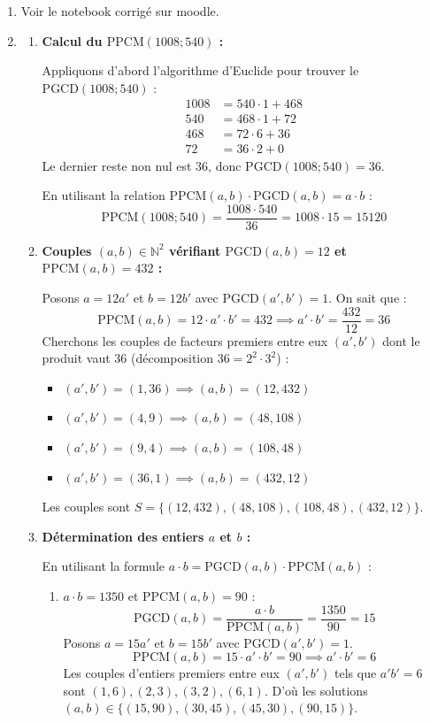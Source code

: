 \begin{enumerate}[label=\thechapter.\arabic*, font=\bfseries, itemsep=7mm,labelsep*=3mm,left=0mm]
\item Voir le notebook corrigé sur moodle.

\item
\begin{enumerate}[label=\textbf{\alph*)}, leftmargin=*]
	\item \textbf{Calcul du $\text{PPCM}(1008; 540)$ :}
	
	Appliquons d'abord l'algorithme d'Euclide pour trouver le $\text{PGCD}(1008; 540)$ :
	\begin{align*}
		1008 &= 540 \cdot 1 + 468 \\
		540 &= 468 \cdot 1 + 72 \\
		468 &= 72 \cdot 6 + 36 \\
		72 &= 36 \cdot 2 + 0
	\end{align*}
	Le dernier reste non nul est $36$, donc $\text{PGCD}(1008; 540) = 36$.
	
	En utilisant la relation $\text{PPCM}(a,b) \cdot \text{PGCD}(a,b) = a \cdot b$ :
	\[
	\text{PPCM}(1008; 540) = \frac{1008 \cdot 540}{36} = 1008 \cdot 15 = 15120
	\]
	
	\item \textbf{Couples $(a,b) \in \mathbb{N}^2$ vérifiant $\text{PGCD}(a,b) = 12$ et $\text{PPCM}(a,b) = 432$ :}
	
	Posons $a = 12a'$ et $b = 12b'$ avec $\text{PGCD}(a', b') = 1$.
	On sait que :
	\[
	\text{PPCM}(a,b) = 12 \cdot a' \cdot b' = 432 \implies a' \cdot b' = \frac{432}{12} = 36
	\]
	Cherchons les couples de facteurs premiers entre eux $(a', b')$ dont le produit vaut $36$ (décomposition $36 = 2^2 \cdot 3^2$) :
	\begin{itemize}
		\item $(a', b') = (1, 36) \implies (a,b) = (12, 432)$
		\item $(a', b') = (4, 9) \implies (a,b) = (48, 108)$
		\item $(a', b') = (9, 4) \implies (a,b) = (108, 48)$
		\item $(a', b') = (36, 1) \implies (a,b) = (432, 12)$
	\end{itemize}
	Les couples sont $S = \{(12, 432), (48, 108), (108, 48), (432, 12)\}$.
	
	\item \textbf{Détermination des entiers $a$ et $b$ :}
	
	En utilisant la formule $a \cdot b = \text{PGCD}(a,b) \cdot \text{PPCM}(a,b)$ :
	
	\begin{enumerate}[label=\textbf{\arabic*)}, leftmargin=*]
		\item $a \cdot b = 1350$ et $\text{PPCM}(a,b) = 90$ :
		\[
		\text{PGCD}(a,b) = \frac{a \cdot b}{\text{PPCM}(a,b)} = \frac{1350}{90} = 15
		\]
		Posons $a = 15a'$ et $b = 15b'$ avec $\text{PGCD}(a', b') = 1$.
		\[
		\text{PPCM}(a,b) = 15 \cdot a' \cdot b' = 90 \implies a' \cdot b' = 6
		\]
		Les couples d'entiers premiers entre eux $(a',b')$ tels que $a'b' = 6$ sont $(1,6), (2,3), (3,2), (6,1)$.
		D'où les solutions $(a,b) \in \{(15, 90), (30, 45), (45, 30), (90, 15)\}$.
		

\end{enumerate}
\end{enumerate}
\end{enumerate}
